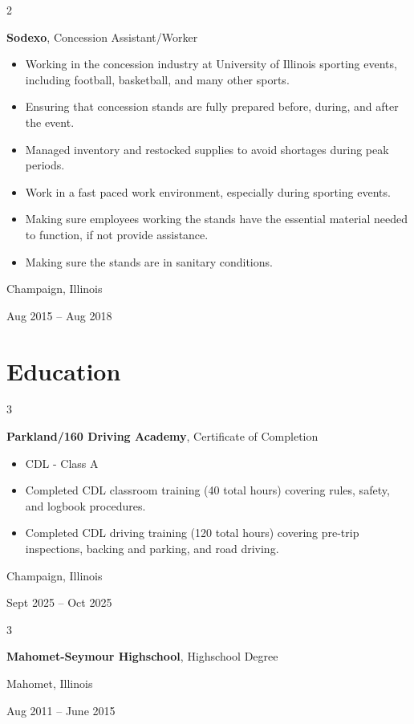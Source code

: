 \documentclass[10pt, letterpaper]{article}
\newenvironment{highlights}{
    \begin{itemize}[
        topsep=0.10 cm,
        parsep=0.10 cm,
        partopsep=0pt,
        itemsep=0pt,
        leftmargin=0.4 cm + 10pt
    ]
}{
    \end{itemize}
} %
\newenvironment{twocolentry}[2][]{
    \onecolentry
    \def\secondColumn{#2}
    \setcolumnwidth{\fill, 4.5 cm}
    \begin{paracol}{2}
}{
    \switchcolumn \raggedleft \secondColumn
    \end{paracol}
    \endonecolentry
} %
\newenvironment{threecolentry}[3][]{
    \onecolentry
    \def\thirdColumn{#3}
    \setcolumnwidth{1 cm, \fill, 4.5 cm}
    \begin{paracol}{3}
    {\raggedright #2} \switchcolumn
}{
    \switchcolumn \raggedleft \thirdColumn
    \end{paracol}
    \endonecolentry
} %
\begin{document}
        \vspace{0.2 cm}

        \begin{twocolentry}{
            Champaign, Illinois

        Aug 2015 – Aug 2018
        }
            \textbf{Sodexo}, Concession Assistant/Worker
            \begin{highlights}
                \item Working in the concession industry at University of Illinois sporting events, including football, basketball, and many other sports.
                \item Ensuring that concession stands are fully prepared before, during, and after the event.
                \item Managed inventory and restocked supplies to avoid shortages during peak periods.
                \item Work in a fast paced work environment, especially during sporting events.
                \item Making sure employees working the stands have the essential material needed to function, if not provide assistance.
                \item Making sure the stands are in sanitary conditions.
            \end{highlights}
        \end{twocolentry}



    
    \section{Education}



        
        \begin{threecolentry}{\textbf{}}{
            Champaign, Illinois

        Sept 2025 – Oct 2025
        }
            \textbf{Parkland/160 Driving Academy}, Certificate of Completion
            \begin{highlights}
                \item CDL - Class A
                \item Completed CDL classroom training (40 total hours) covering rules, safety, and logbook procedures.
                \item Completed CDL driving training (120 total hours) covering pre-trip inspections, backing and parking, and road driving.
            \end{highlights}
        \end{threecolentry}

        \vspace{0.2 cm}

        \begin{threecolentry}{\textbf{}}{
            Mahomet, Illinois

        Aug 2011 – June 2015
        }
            \textbf{Mahomet-Seymour Highschool}, Highschool Degree
        \end{threecolentry}


    
\end{document}
